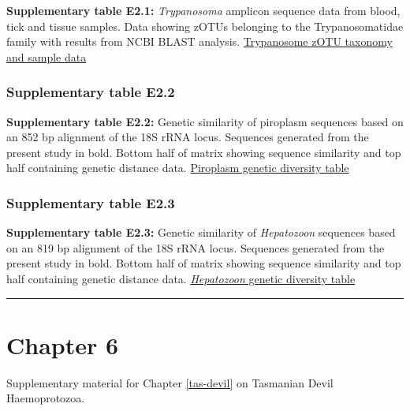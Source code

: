 \documentclass[a4paper, nobind]{templates/ociamthesis}
\begin{document}
\textbf{Supplementary table E2.1:} \emph{Trypanosoma} amplicon sequence data from blood, tick and tissue samples. Data showing zOTUs belonging to the Trypanosomatidae family with results from NCBI BLAST analysis. \href{https://figshare.com/ndownloader/files/30578460}{Trypanosome zOTU taxonomy and sample data}

\hypertarget{supplementary-table-e2.2}{%
\subsubsection{Supplementary table E2.2}\label{supplementary-table-e2.2}}

\textbf{Supplementary table E2.2:} Genetic similarity of piroplasm sequences based on an 852 bp alignment of the 18S rRNA locus. Sequences generated from the present study in bold. Bottom half of matrix showing sequence similarity and top half containing genetic distance data.
\href{https://figshare.com/ndownloader/files/30578457}{Piroplasm genetic diversity table}

\hypertarget{supplementary-table-e2.3}{%
\subsubsection{Supplementary table E2.3}\label{supplementary-table-e2.3}}

\textbf{Supplementary table E2.3:} Genetic similarity of \emph{Hepatozoon} sequences based on an 819 bp alignment of the 18S rRNA locus. Sequences generated from the present study in bold. Bottom half of matrix showing sequence similarity and top half containing genetic distance data.
\href{https://figshare.com/ndownloader/files/30578463}{\emph{Hepatozoon} genetic diversity table}

\begin{center}\rule{0.5\linewidth}{0.5pt}\end{center}

\clearpage

\hypertarget{ch6-supp}{%
\section{Chapter 6}\label{ch6-supp}}

Supplementary material for Chapter \ref{tas-devil} on Tasmanian Devil Haemoprotozoa.
\end{document}
